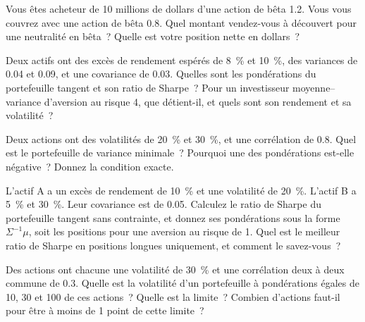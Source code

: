 \begin{question}\label{iq:iv2:portfolio-construction:6}
Vous êtes acheteur de 10 millions de dollars d'une action de bêta 1.2. Vous vous couvrez avec une action de bêta 0.8. Quel montant vendez-vous à découvert pour une neutralité en bêta~? Quelle est votre position nette en dollars~?
\end{question}

\begin{question}\label{iq:iv2:portfolio-construction:7}
Deux actifs ont des excès de rendement espérés de 8~\% et 10~\%, des variances de 0.04 et 0.09, et une covariance de 0.03. Quelles sont les pondérations du portefeuille tangent et son ratio de Sharpe~? Pour un investisseur moyenne--variance d'aversion au risque 4, que détient-il, et quels sont son rendement et sa volatilité~?
\end{question}

\begin{question}\label{iq:iv2:portfolio-construction:8}
Deux actions ont des volatilités de 20~\% et 30~\%, et une corrélation de 0.8. Quel est le portefeuille de variance minimale~? Pourquoi une des pondérations est-elle négative~? Donnez la condition exacte.
\end{question}

\begin{question}\label{iq:iv2:portfolio-construction:9}
L'actif A a un excès de rendement de 10~\% et une volatilité de 20~\%. L'actif B a 5~\% et 30~\%. Leur covariance est de 0.05. Calculez le ratio de Sharpe du portefeuille tangent sans contrainte, et donnez ses pondérations sous la forme $\Sigma^{-1}\mu$, soit les positions pour une aversion au risque de 1. Quel est le meilleur ratio de Sharpe en positions longues uniquement, et comment le savez-vous~?
\end{question}

\begin{question}\label{iq:iv2:portfolio-construction:10}
Des actions ont chacune une volatilité de 30~\% et une corrélation deux à deux commune de 0.3. Quelle est la volatilité d'un portefeuille à pondérations égales de 10, 30 et 100 de ces actions~? Quelle est la limite~? Combien d'actions faut-il pour être à moins de 1 point de cette limite~?
\end{question}

